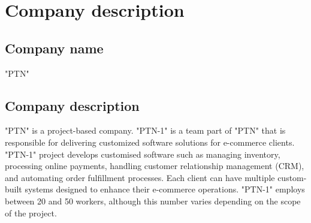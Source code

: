 \section{Company description}

\subsection{Company name}
"PTN"



\subsection{Company description}
"PTN" is a project-based company. "PTN-1" is a team part of "PTN" that is responsible for delivering customized software solutions for e-commerce clients. "PTN-1" project develops customised software such as managing inventory, processing online payments, handling customer relationship management (CRM), and automating order fulfillment processes. Each client can have multiple custom-built systems designed to enhance their e-commerce operations. "PTN-1" employs between 20 and 50 workers, although this number varies depending on the scope of the project.


